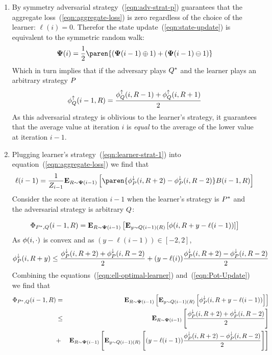 \documentclass{article}[12pt]
\begin{document}
\proof
\begin{enumerate}
\item By symmetry adversarial strategy~(\ref{eqn:adv-strat-p}) guarantees that
  the aggregate loss~(\ref{eqn:aggregate-loss}) is zero regardless of
  the choice of the learner: $\ell(i)=0$.
  Therefor the state update~(\ref{eqn:state-update}) is equivalent to
  the symmetric random walk:
  $$\state(i) = \frac{1}{2} \paren{(\state(i-1) \oplus 1) + (\state(i-1)
    \ominus 1)}$$
  Which in turn implies that if the adversary plays $Q^*$
  and the learner plays an arbitrary strategy $P$
  \begin{equation} \label{eqn:lower}
    \phi_{Q}^{\uparrow}(i-1,R) = \frac{\phi_{Q}^{\uparrow}(i,R-1)+\phi_{Q}^{\uparrow}(i,R+1)}{2}
  \end{equation}
  As this adversarial strategy is oblivious to the learner's strategy, it
  guarantees that the average value at iteration $i$ is {\em equal} to the
  average of the lower value at iteration $i-1$.
\item
  Plugging learner's strategy~(\ref{eqn:learner-strat-1})
  into equation~(\ref{eqn:aggregate-loss}) we find that
 \begin{equation} \label{eqn:ell-optimal-learner}
   \ell(i-1) = \frac{1}{Z_{i-1}} \E{\R \sim \state(i-1)}{\paren{\upperpot(i,\R+2)-\upperpot(i,\R-2)}
   \Bias(i-1,\R)}
\end{equation}
  Consider the score at iteration $i-1$ when the learner's strategy
  is $P^*$ and the adversarial strategy is arbitrary $Q$:
  
   \begin{equation} \label{eqn:Pot-Update}
    \Phi_{P^*,Q}(i-1,R) = {\bf E}_{R \sim {\bf \Psi}(i-1)}\left[  {\bf E}_{y \sim
      Q(i-1)(R)}\left[ \phi(i,R+y-\ell(i-1)) \right] \right]
  \end{equation}
  As $\phi(i,\cdot)$ is convex and as $(y-\ell(i-1)) \in [-2,2]$,
  \begin{equation} \label{eqn:pot-upper}
    \phi_{P}^{\downarrow}(i,R+y) \leq \frac{\phi_{P}^{\downarrow}(i,R+2)+\phi_{P}^{\downarrow}(i,R-2)}{2} +
    (y-\ell(i)) \frac{\phi_{P}^{\downarrow}(i,R+2)-\phi_{P}^{\downarrow}(i,R-2)}{2}
    \end{equation}
  Combining the equations~(\ref{eqn:ell-optimal-learner}) and~(\ref{eqn:Pot-Update}) we find that
  \begin{eqnarray}
  \Phi_{P^*,Q}(i-1,R)&=&{\bf E}_{R \sim {\bf \Psi}(i-1)}\left[ {\bf E}_{y \sim Q(i-1)(R)}\left[ \phi_{P}^{\downarrow}(i,R+y-\ell(i-1)) \right] \right]\\
  &\leq & {\bf E}_{R \sim {\bf \Psi}(i-1)}\left[ \frac{\phi_{P}^{\downarrow}(i,R+2)+\phi_{P}^{\downarrow}(i,R-2)}{2} \right]\\
  &+&
  {\bf E}_{R \sim {\bf \Psi}(i-1)}\left[ {\bf E}_{y \sim Q(i-1)(R)}\left[ (y-\ell(i-1)) \frac{\phi_{P}^{\downarrow}(i,R+2)-\phi_{P}^{\downarrow}(i,R-2)}{2} \right] \right] \label{eqn:zero-term}
  \end{eqnarray}
  

\end{enumerate}
\end{document}
